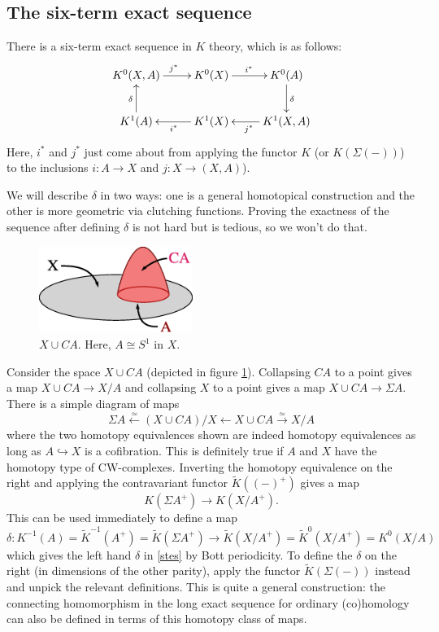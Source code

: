 \documentclass[a4paper,10pt]{article}
\theoremstyle{plain}%
\theoremstyle{definition}
\theoremstyle{remark}
\newcommand{\into}{\hookrightarrow}
\newcommand{\xto}[1]{\xrightarrow{#1}}
\newcommand{\xot}[1]{\xleftarrow{#1}}
\newcommand{\ot}{\leftarrow}
\begin{document}
\subsection{The six-term exact sequence}

There is a six-term exact sequence in $K$ theory, which is as follows:
\begin{equation}
  \label{stes}
  \xymatrix{
    K^0(X,A) \ar[r]^{j^*} & K^0(X) \ar[r]^{i^*} & K^0(A)\ar[d]^{\delta}\\
    K^1(A)\ar[u]^{\delta} & K^1(X)\ar[l]^{i^*} & K^1(X,A)\ar[l]^{j^*}
  }
\end{equation}
Here, $i^*$ and $j^*$ just come about from applying the functor $K$
(or $K(\Sigma(-))$) to the inclusions $i: A\to X$ and $j: X\to
(X,A)$).

We will describe $\delta$ in two ways: one is a general homotopical
construction and the other is more geometric via clutching
functions. Proving the exactness of the sequence after defining
$\delta$ is not hard but is tedious, so we won't do that.

\begin{figure}
  \centering
  \label{xcupca}
  \includegraphics[width=5cm]{img/cone-on-A}
  \caption{$X \cup CA$. Here, $A \cong S^1$ in $X$.}
\end{figure}

Consider the space $X \cup CA$ (depicted in figure
\ref{xcupca}). Collapsing $CA$ to a point gives a map $X\cup CA \to
X/A$ and collapsing $X$ to a point gives a map $X\cup CA \to \Sigma
A$. There is a simple diagram of maps
\begin{equation*}
  \Sigma A \xot{\simeq} (X\cup CA) / X \ot X\cup CA \xto{\simeq} X/A
\end{equation*}
where the two homotopy equivalences shown are indeed homotopy
equivalences as long as $A \into X$ is a cofibration. This is
definitely true if $A$ and $X$ have the homotopy type of
CW-complexes. Inverting the homotopy equivalence on the right and
applying the contravariant functor $\tilde{K}((-)^+)$ gives a map
\begin{equation*}
  K(\Sigma A^+) \to K(X/A^+).
\end{equation*}
This can be used immediately to define a map
\begin{equation*}
  \delta: K^{-1}(A) = \tilde{K}^{-1}(A^+) = \tilde{K}(\Sigma A^+) \to
  \tilde{K}(X/A^+) = \tilde{K}^0(X/A^+) = K^0(X/A)
\end{equation*}
which gives the left hand $\delta$ in \eqref{stes} by Bott
periodicity. To define the $\delta$ on the right (in dimensions of the
other parity), apply the functor $\tilde{K}(\Sigma (-))$ instead and
unpick the relevant definitions. This is quite a general construction:
the connecting homomorphism in the long exact sequence for ordinary
(co)homology can also be defined in terms of this homotopy class of
maps.
\end{document}

